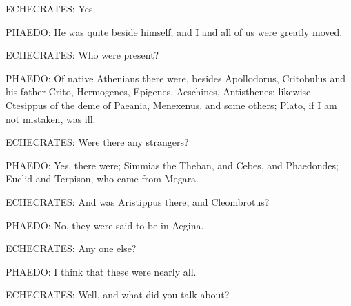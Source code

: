 ECHECRATES: Yes.

PHAEDO: He was quite beside himself; and I and all of us were greatly
moved.

ECHECRATES: Who were present?

PHAEDO: Of native Athenians there were, besides Apollodorus, Critobulus
and his father Crito, Hermogenes, Epigenes, Aeschines, Antisthenes;
likewise Ctesippus of the deme of Paeania, Menexenus, and some others;
Plato, if I am not mistaken, was ill.

ECHECRATES: Were there any strangers?

PHAEDO: Yes, there were; Simmias the Theban, and Cebes, and Phaedondes;
Euclid and Terpison, who came from Megara.

ECHECRATES: And was Aristippus there, and Cleombrotus?

PHAEDO: No, they were said to be in Aegina.

ECHECRATES: Any one else?

PHAEDO: I think that these were nearly all.

ECHECRATES: Well, and what did you talk about?

